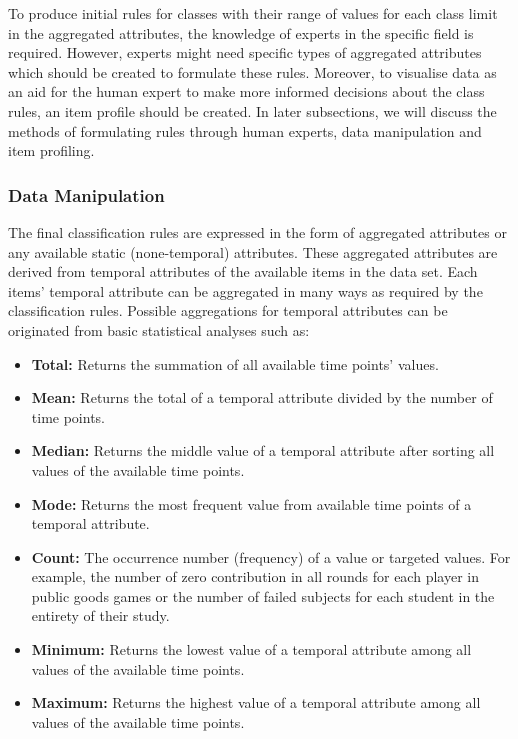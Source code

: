 To produce initial rules for classes with their range of values for each class limit in the aggregated attributes, the knowledge of experts in the specific field is required. However, experts might need specific types of aggregated attributes which should be created to formulate these rules. Moreover, to visualise data as an aid for the human expert to make more informed decisions about the class rules, an item profile should be created. In later subsections, we will discuss the methods of formulating rules through human experts, data manipulation and item profiling.

\subsubsection{Data Manipulation}

The final classification rules are expressed in the form of aggregated attributes or any available static (none-temporal) attributes. These aggregated attributes are derived from temporal attributes of the available items in the data set. Each items' temporal attribute can be aggregated in many ways as required by the classification rules. Possible aggregations for temporal attributes can be originated from basic statistical analyses such as:

\begin{itemize}
    \item \textbf{Total:} Returns the summation of all available time points' values.
    \item \textbf{Mean:} Returns the total of a temporal attribute divided by the number of time points.
    \item \textbf{Median:} Returns the middle value of a temporal attribute after sorting all values of the available time points.
    \item \textbf{Mode:} Returns the most frequent value from available time points of a temporal attribute.    \item \textbf{Count:} The occurrence number (frequency) of a value or targeted values. For example, the number of zero contribution in all rounds for each player in public goods games or the number of failed subjects for each student in the entirety of their study.
    \item \textbf{Minimum:} Returns the lowest value of a temporal attribute among all values of the available time points.
    \item \textbf{Maximum:} Returns the highest value of a temporal attribute among all values of the available time points.
\end{itemize}

